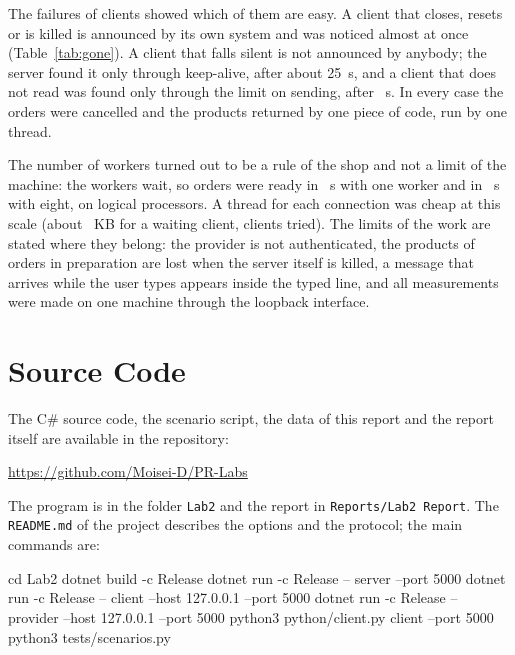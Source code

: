 \documentclass[12pt,a4paper]{article}
\begin{document}
The failures of clients showed which of them are easy. A client that closes, resets or is killed is announced by its own system and was noticed almost at once (Table~\ref{tab:gone}). A client that falls silent is not announced by anybody; the server found it only through keep-alive, after \ifnum{} \netSeconds\else about 25\fi~s, and a client that does not read was found only through the limit on sending, after \muteSeconds~s. In every case the orders were cancelled and the products returned by one piece of code, run by one thread.

The number of workers turned out to be a rule of the shop and not a limit of the machine: the workers wait, so \workOrders{} orders were ready in \workSecondsOne~s with one worker and in \workSecondsEight~s with eight, on \envLogical{} logical processors. A thread for each connection was cheap at this scale (about \idleKbPerClient~KB for a waiting client, \idleClientsMax{} clients tried). The limits of the work are stated where they belong: the provider is not authenticated, the products of orders in preparation are lost when the server itself is killed, a message that arrives while the user types appears inside the typed line, and all measurements were made on one machine through the loopback interface.

\section{Source Code}

The C\# source code, the scenario script, the data of this report and the report itself are available in the repository:

\begin{center}
  \url{https://github.com/Moisei-D/PR-Labs}
\end{center}

The program is in the folder \texttt{Lab2} and the report in \texttt{Reports/Lab2 Report}. The \texttt{README.md} of the project describes the options and the protocol; the main commands are:

\begin{terminaloutput}
cd Lab2
dotnet build -c Release
dotnet run -c Release -- server --port 5000
dotnet run -c Release -- client --host 127.0.0.1 --port 5000
dotnet run -c Release -- provider --host 127.0.0.1 --port 5000
python3 python/client.py client --port 5000
python3 tests/scenarios.py
\end{terminaloutput}
\end{document}
